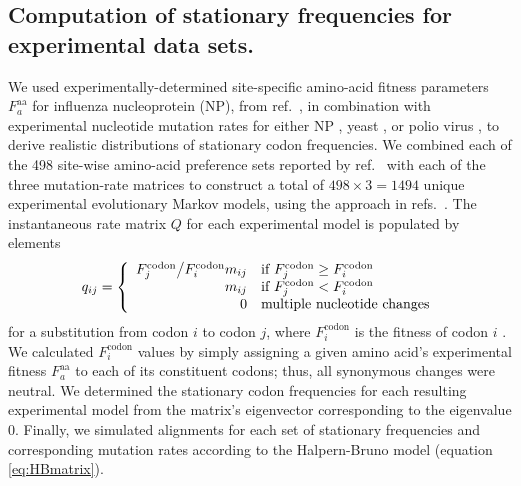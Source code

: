 \documentclass[11pt]{article}
\begin{document}
\subsection*{Computation of stationary frequencies for experimental data sets.}
We used experimentally-determined site-specific amino-acid fitness parameters $F^\text{aa}_a$ for influenza nucleoprotein (NP), from ref.\ \citep{Bloom2014a}, in combination with experimental nucleotide mutation rates for either NP \citep{Bloom2014a}, yeast \citep{Zhu2014}, or polio virus \citep{Acevedo2014}, to derive realistic distributions of stationary codon frequencies. We combined each of the  498 site-wise amino-acid preference sets reported by ref.\ \citep{Bloom2014a} with each of the three mutation-rate matrices to construct a total of $498 \times 3 = 1494$ unique experimental evolutionary Markov models, using the approach in refs.\ \citep{Bloom2014a,Bloom2014b}. The instantaneous rate matrix $Q$ for each experimental model is populated by elements
\begin{equation}
q_{ij} =  \left\{ 
\begin{array}{rl}
  F^\text{codon}_j \big{/} F^\text{codon}_i m_{ij} & \text{if $F^\text{codon}_j \geq F^\text{codon}_i$} \\
  m_{ij}                                           & \text{if $F^\text{codon}_j < F^\text{codon}_i$} \\ 
  0                                                & \text{multiple nucleotide changes}  \\
\end{array} \right.
\end{equation} for a substitution from codon $i$ to codon $j$, where $F^\text{codon}_i$ is the fitness of codon $i$ \citep{Bloom2014a,Bloom2014b}. We calculated $F^\text{codon}_i$ values by simply assigning a given amino acid's experimental fitness $F^\text{aa}_a$ to each of its constituent codons; thus, all synonymous changes were neutral. We determined the stationary codon frequencies for each resulting experimental model from the matrix's eigenvector corresponding to the eigenvalue 0. Finally, we simulated alignments for each set of stationary frequencies and corresponding mutation rates according to the Halpern-Bruno model (equation \eqref{eq:HBmatrix}).   

		
\end{document}
